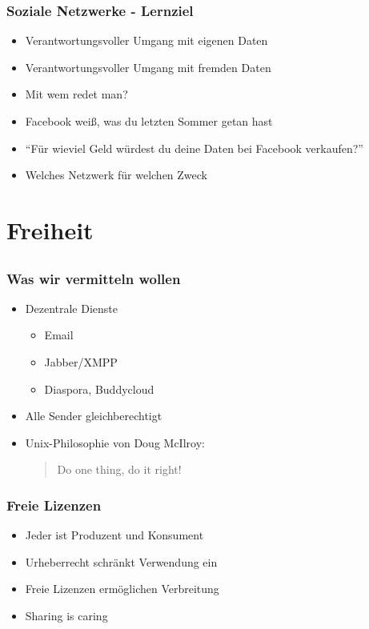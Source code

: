 \documentclass{beamer}
\newcommand{\ben}[1]{\pdfcomment[author=Ben]{#1}}
\begin{document}
\begin{frame}
  \frametitle{Soziale Netzwerke - Lernziel}
  \begin{itemize}
    \item<2-> Verantwortungsvoller Umgang mit eigenen Daten
    \item<3-> Verantwortungsvoller Umgang mit fremden Daten
    \item<4-> Mit wem redet man?
    \item<5-> Facebook weiß, was du letzten Sommer getan hast
    \item<6-> "`Für wieviel Geld würdest du deine Daten bei Facebook verkaufen?"'
    \item<7-> Welches Netzwerk für welchen Zweck
  \end{itemize}
\end{frame}

\section{Freiheit}
\subsection{}

\begin{frame}
  \frametitle{Was wir vermitteln wollen}
  \begin{itemize}
    \item<2-> Dezentrale Dienste
      \begin{itemize}
        \item<3-> Email
        \item<4-> Jabber/XMPP
        \item<5-> Diaspora, Buddycloud
      \end{itemize}
    \item<6-> Alle Sender gleichberechtigt
    \item<7-> Unix-Philosophie von Doug McIlroy:
        \begin{quote}Do one thing, do it right!
        \end{quote}
  \end{itemize}
\end{frame}

\begin{frame}
  \frametitle{Freie Lizenzen}
  \begin{itemize}
    \item<2-> Jeder ist Produzent und Konsument
    \item<3-> Urheberrecht schränkt Verwendung ein
    \item<4-> Freie Lizenzen ermöglichen Verbreitung \textcopyleft
    \item<5-> Sharing is caring
  \end{itemize}
\end{frame}
\end{document}
